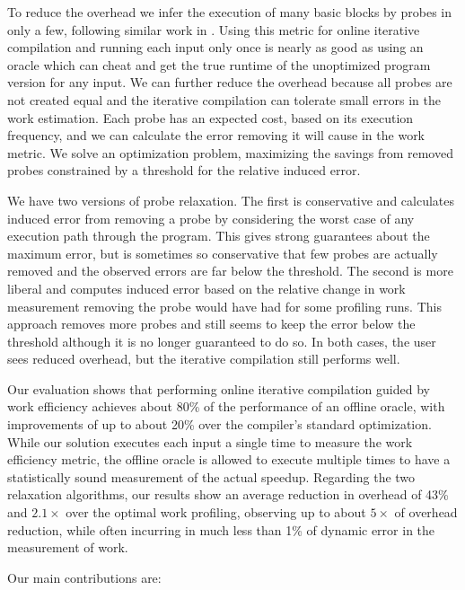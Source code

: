     To reduce the overhead we infer the execution of many basic blocks by probes in only a few, following similar work in \cite{??}. Using
    this metric for online iterative compilation and running each input only once is nearly as good as using an oracle which can cheat and
    get the true runtime of the unoptimized program version for any input. We can further reduce the overhead because all probes are not
    created equal and the iterative compilation can tolerate small errors in the work estimation. Each probe has an expected cost, based on
    its execution frequency, and we can calculate the error removing it will cause in the work metric. We solve an optimization problem,
    maximizing the savings from removed probes constrained by a threshold for the relative induced error.

    We have two versions of probe relaxation. The first is conservative and calculates induced error from removing a probe by considering
    the worst case of any execution path through the program. This gives strong guarantees about the maximum error, but is sometimes so
    conservative that few probes are actually removed and the observed errors are far below the threshold. The second is more liberal and
    computes induced error based on the relative change in work measurement removing the probe would have had for some profiling runs. This
    approach removes more probes and still seems to keep the error below the threshold although it is no longer guaranteed to do so. In
    both cases, the user sees reduced overhead, but the iterative compilation still performs well.
    
    Our evaluation shows that performing online iterative compilation guided by work efficiency achieves about 80\% of the performance of
    an offline oracle, with improvements of up to about 20\% over the compiler's standard optimization. While our solution executes each
    input a single time to measure the work efficiency metric, the offline oracle is allowed to execute multiple times to have a
    statistically sound measurement of the actual speedup. Regarding the two relaxation algorithms, our results show an average reduction
    in overhead of 43\% and $2.1\times$ over the optimal work profiling, observing up to about $5\times$ of overhead reduction, while often
    incurring in much less than 1\% of dynamic error in the measurement of work.
    
    Our main contributions are:

